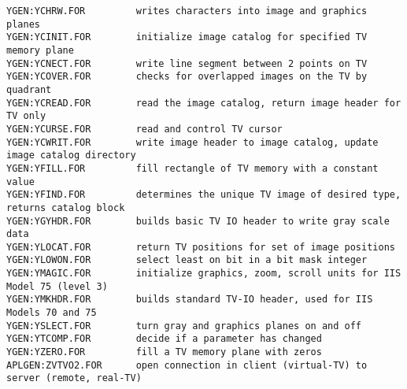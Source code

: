 \begin{verbatim}
YGEN:YCHRW.FOR         writes characters into image and graphics planes
YGEN:YCINIT.FOR        initialize image catalog for specified TV memory plane
YGEN:YCNECT.FOR        write line segment between 2 points on TV
YGEN:YCOVER.FOR        checks for overlapped images on the TV by quadrant
YGEN:YCREAD.FOR        read the image catalog, return image header for TV only
YGEN:YCURSE.FOR        read and control TV cursor
YGEN:YCWRIT.FOR        write image header to image catalog, update image catalog directory
YGEN:YFILL.FOR         fill rectangle of TV memory with a constant value
YGEN:YFIND.FOR         determines the unique TV image of desired type, returns catalog block
YGEN:YGYHDR.FOR        builds basic TV IO header to write gray scale data
YGEN:YLOCAT.FOR        return TV positions for set of image positions
YGEN:YLOWON.FOR        select least on bit in a bit mask integer
YGEN:YMAGIC.FOR        initialize graphics, zoom, scroll units for IIS Model 75 (level 3)
YGEN:YMKHDR.FOR        builds standard TV-IO header, used for IIS Models 70 and 75
YGEN:YSLECT.FOR        turn gray and graphics planes on and off
YGEN:YTCOMP.FOR        decide if a parameter has changed
YGEN:YZERO.FOR         fill a TV memory plane with zeros
APLGEN:ZVTVO2.FOR      open connection in client (virtual-TV) to server (remote, real-TV)
\end{verbatim}
 
